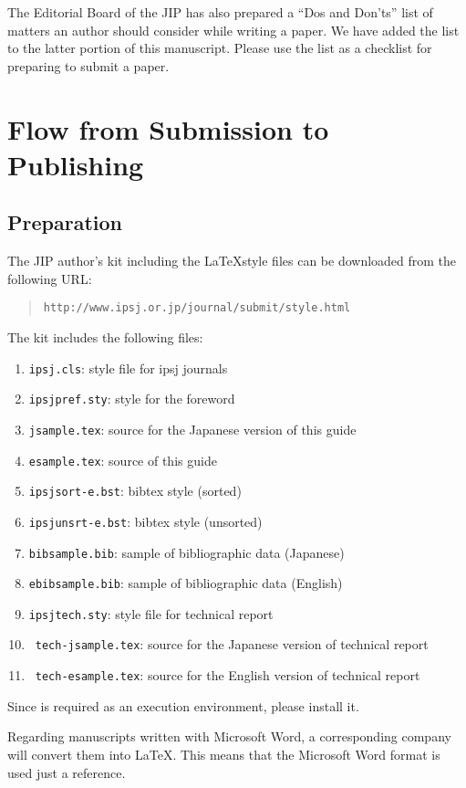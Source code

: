 \documentclass[Japanese,preprint,JIP]{ipsj}
\def\|{\verb|}
\begin{document}
The Editorial Board of the JIP has also prepared a ``Dos and Don'ts''
list of matters an author should consider while writing a paper.  We
have added the list to the latter portion of this manuscript.  Please
use the list as a checklist for preparing to submit a paper.

%2
\section{Flow from Submission to Publishing}
%2.1
\subsection{Preparation}

The JIP author's kit including the \LaTeX style files can be downloaded
from the following URL:
\begin{quote}
 \small
 \|http://www.ipsj.or.jp/journal/submit/style.html|
\end{quote}
The kit includes the following files:
\begin{enumerate}
\item \|ipsj.cls|: style file for ipsj journals
\item \|ipsjpref.sty|: style for the foreword
\item \|jsample.tex|: source for the Japanese version of this guide
\item \|esample.tex|: source of this guide
\item \|ipsjsort-e.bst|: bibtex style (sorted)
\item \|ipsjunsrt-e.bst|: bibtex style (unsorted)
\item \|bibsample.bib|: sample of bibliographic data (Japanese)
\item \|ebibsample.bib|: sample of bibliographic data (English)

\item \|ipsjtech.sty|: style file for technical report
\item \ \|tech-jsample.tex|: source for the Japanese version of technical report
\item \ \|tech-esample.tex|: source for the English version of technical report
\end{enumerate}



Since {\LaTeXe} is required as an execution environment, please install
it.

Regarding manuscripts written with Microsoft Word, a corresponding
company will convert them into \LaTeX\@.  This means that the Microsoft
Word format is used just a reference.
\end{document}
